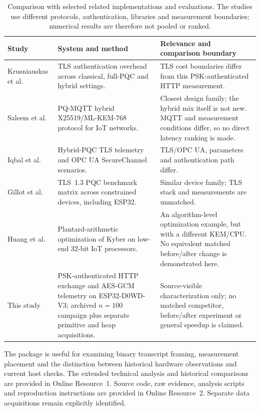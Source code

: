 \documentclass[pdflatex,sn-mathphys-num]{sn-jnl}
\begin{document}
\begin{table}[htbp]
\caption{Comparison with selected related implementations and evaluations. The studies use different protocols, authentication, libraries and measurement boundaries; numerical results are therefore not pooled or ranked.}
\label{tab:positioning}
\centering\footnotesize
\setlength{\tabcolsep}{4pt}
\renewcommand{\arraystretch}{1.12}
\begin{tabularx}{\textwidth}{>{\raggedright\arraybackslash}p{}>{\raggedright\arraybackslash}p{}>{\raggedright\arraybackslash}X}
\toprule
Study & System and method & Relevance and comparison boundary\\
\midrule
Krusniauskas et al.~\cite{b44} & TLS authentication overhead across classical, full-PQC and hybrid settings. & TLS cost boundaries differ from this PSK-authenticated HTTP measurement.\\
Saleem et al.~\cite{b45} & PQ-MQTT hybrid X25519/ML-KEM-768 protocol for IoT networks. & Closest design family; the hybrid mix itself is not new. MQTT and measurement conditions differ, so no direct latency ranking is made.\\
Iqbal et al.~\cite{b46} & Hybrid-PQC TLS telemetry and OPC UA SecureChannel scenarios. & TLS/OPC UA, parameters and authentication path differ.\\
Gillot et al.~\cite{b47} & TLS~1.3 PQC benchmark matrix across constrained devices, including ESP32. & Similar device family; TLS stack and measurements are unmatched.\\
Huang et al.~\cite{b13} & Plantard-arithmetic optimization of Kyber on low-end 32-bit IoT processors. & An algorithm-level optimization example, but with a different KEM/CPU. No equivalent matched before/after change is demonstrated here.\\
This study & PSK-authenticated HTTP exchange and AES-GCM telemetry on ESP32-D0WD-V3; archived $n=100$ campaign plus separate primitive and heap acquisitions. & Source-visible characterization only; no matched competitor, before/after experiment or general speedup is claimed.\\
\bottomrule
\end{tabularx}
\end{table}

The package is useful for examining binary transcript framing, measurement placement and the distinction between historical hardware observations and current host checks. The extended technical analysis and historical comparisons are provided in Online Resource~1. Source code, raw evidence, analysis scripts and reproduction instructions are provided in Online Resource~2. Separate data acquisitions remain explicitly identified.
\end{document}
